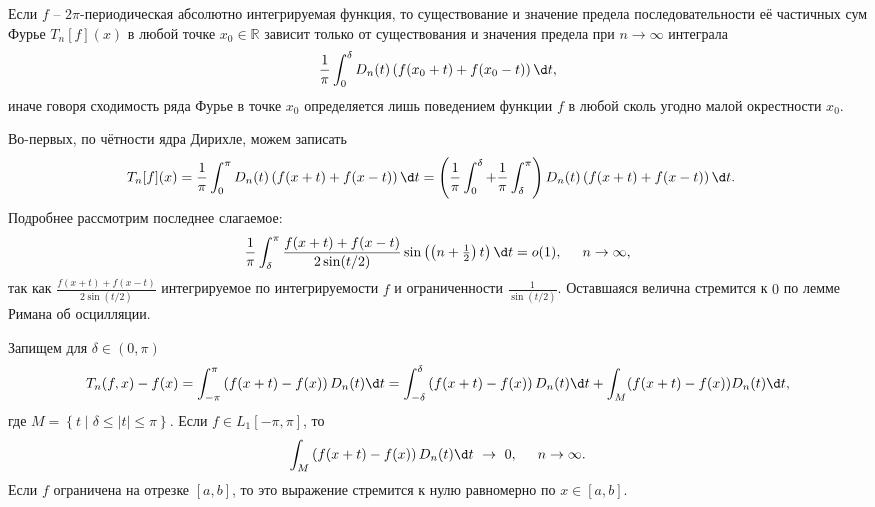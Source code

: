 

\begin{to_thr}
    Если $f$ -- $2\pi$-периодическая абсолютно интегрируемая функция, то существование и значение предела последовательности её частичных сум Фурье $T_n[f](x)$ в любой точке $x_0 \in \mathbb{R}$ зависит только от существования и значения предела при $n \to \infty$ интеграла
    \begin{equation*}
        \frac{1}{\pi} \int_0^\delta D_n(t) \left(
            f(x_0 + t) + f(x_0 - t)
        \right) \d t,
    \end{equation*}
    иначе говоря сходимость ряда Фурье в точке $x_0$ определяется лишь поведением функции $f$ в любой сколь угодно малой окрестности $x_0$. 
\end{to_thr}

\begin{uproof}
    Во-первых, по чётности ядра Дирихле, можем записать
    \begin{align*}
        T_n[f](x) &= \frac{1}{\pi} \int_{0}^{\pi} D_n(t) \left(
            f(x+t) + f(x-t)
        \right) \d t = 
        \left(
            \frac{1}{\pi} \int_{0}^{\delta}  + \frac{1}{\pi} \int_{\delta}^{\pi} 
        \right) D_n(t) \left(
            f(x+t) + f(x-t)
        \right) \d t.
    \end{align*}
    Подробнее рассмотрим последнее слагаемое:
    \begin{equation*}
        \frac{1}{\pi} \int_{\delta}^{\pi} \frac{f(x+t)+f(x-t)}{2 \sin (t/2)} \sin\left(
            \left(n + \textstyle\frac{1}{2}\right)t
        \right) \d t = o(1), \hspace{5 mm} n \to \infty,
    \end{equation*}
    так как $\frac{f(x+t) + f(x-t)}{2 \sin (t/2)}$ интегрируемое по интегрируемости $f$ и ограниченности $\frac{1}{\sin(t/2)}$. Оставшаяся велична стремится к $0$ по лемме Римана об осцилляции.
\end{uproof}


\begin{to_thr}
    Запищем для $\delta \in (0, \pi)$
    \begin{equation*}
        T_n (f, x) - f(x) = 
        \int_{-\pi}^{\pi} 
        \left(
            f(x+t) - f(x)
        \right) D_n (t) \d t =
        \int_{-\delta}^{\delta} \left(
            f(x+t) - f(x)
        \right) D_n (t) \d t + 
        \int_M 
        (f(x+t)-f(x)) D_n (t) \d t,
    \end{equation*}
    где $M = \left\{t \mid \delta \leq |t| \leq \pi\right\}$. Если $f \in L_1 [-\pi, \pi]$, то
    \begin{equation*}
        \int_M \left(
            f(x+t) - f(x)
        \right) D_n (t) \d t
        \ \to \ 0, \hspace{0.5 cm} n \to \infty.
    \end{equation*}
    Если $f$ ограничена на отрезке $[a, b]$, то это выражение стремится к нулю равномерно по $x \in [a, b]$.
\end{to_thr}

